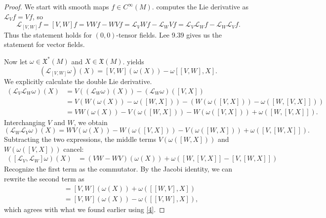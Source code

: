 \documentclass[11pt, letterpaper]{article}
\begin{document}
\begin{proof}
	We start with smooth maps $f\in C^\infty (M)$.  computes the Lie derivative as $\mathcal{L} _Vf=Vf$, so
	\[
		\mathcal{L} _{[V,W]} f=[V,W]f=VWf-WVf=\mathcal{L} _VWf - \mathcal{L} _WVf=\mathcal{L} _V\mathcal{L} _Wf-\mathcal{L} _W\mathcal{L}_Vf
	.\]
	Thus the statement holds for $(0,0)$-tensor fields. Lee 9.39 gives us the statement for vector fields.

	Now let $\omega \in \mathfrak{X} ^*(M)$ and $X\in \mathfrak{X} (M)$.  yields
	\[
		(\mathcal{L} _{[V,W]} \omega )(X)=[V,W](\omega (X))-\omega [[V,W],X]
	.\]
	We explicitly calculate the double Lie derivative.
    \begin{align*}
        (\mathcal{L} _V \mathcal{L} _W \omega)(X) &= V((\mathcal{L} _W \omega)(X)) - (\mathcal{L} _W \omega)([V,X]) \\
        &= V(W(\omega(X)) - \omega([W,X])) - \left( W(\omega([V,X])) - \omega([W, [V,X]]) \right) \\
        &= VW(\omega(X)) - V(\omega([W,X])) - W(\omega([V,X])) + \omega([W, [V,X]])
    .\end{align*}
    Interchanging $V$ and $W$, we obtain
    \[
        (\mathcal{L} _W \mathcal{L} _V \omega)(X) = WV(\omega(X)) - W(\omega([V,X])) - V(\omega([W,X])) + \omega([V, [W,X]])
    .\]
    Subtracting the two expressions, the middle terms $V(\omega([W,X]))$ and $W(\omega([V,X]))$ cancel:
    \begin{align*}
        ([\mathcal{L} _V, \mathcal{L} _W]\omega)(X) &= (VW-WV)(\omega(X)) + \omega([W, [V,X]] - [V, [W,X]]) 
\end{align*}
Recognize the first term as the commutator. By the Jacobi identity, we can rewrite the second term as
\begin{align*}
        &= [V,W](\omega(X)) + \omega([[W,V], X])  \\
        &= [V,W](\omega(X)) - \omega([[V,W], X]) 
    ,\end{align*}
    which agrees with what we found earlier using \cref{4}.


\end{proof}
\end{document}

